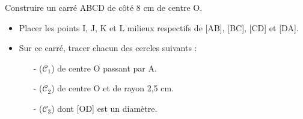 \begin{exercice*}
   \phantom{rrr}
   
   Construire un carré ABCD de côté 8 cm de centre O.
   \begin{itemize}
      \item Placer les points I, J, K et L milieux respectifs de [AB], [BC], [CD] et [DA].
      \item Sur ce carré, tracer chacun des cercles suivants :
      \begin{itemize}
         \item[-] ($\mathcal{C}_1$) de centre O passant par A.
         \item[-] ($\mathcal{C}_2$) de centre O et de rayon 2,5 cm.
         \item[-] ($\mathcal{C}_3$) dont [OD] est un diamètre.
      \end{itemize}
   \end{itemize}
 \end{exercice*} 
   
 